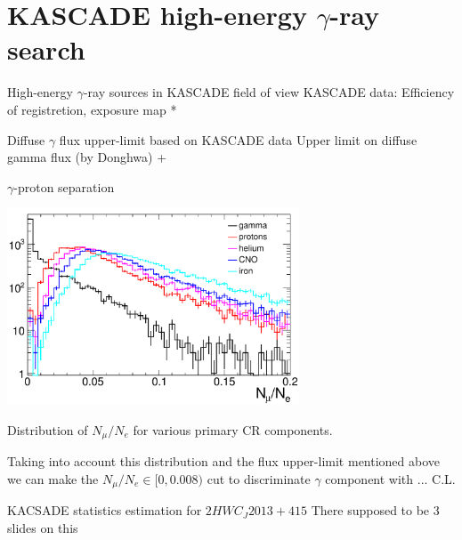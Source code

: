 
\section{KASCADE high-energy $\gamma$-ray search}

\begin{frame}{High-energy $\gamma$-ray sources in KASCADE field of view}
  KASCADE data: Efficiency of registretion, exposure map *
\end{frame}

\begin{frame}{Diffuse $\gamma$ flux upper-limit based on KASCADE data}
  Upper limit on diffuse gamma flux (by Donghwa) +
\end{frame}

\begin{frame}{$\gamma$-proton separation}
\small
\vspace{-1em}
\begin{center}
    \includegraphics[width=0.65\textwidth]{pics/Nmu_Ne.pdf}
    
    Distribution of $N_\mu / N_e$ for various primary CR components.
\end{center}
Taking into account this distribution and the flux upper-limit mentioned above we can make the 
$N_\mu/N_e \in [0, 0.008)$ cut to discriminate $\gamma$ component with ... C.L.
\end{frame}

\begin{frame}{KACSADE statistics estimation for $2HWC_J2013+415$}
There supposed to be 3 slides on this
\end{frame}